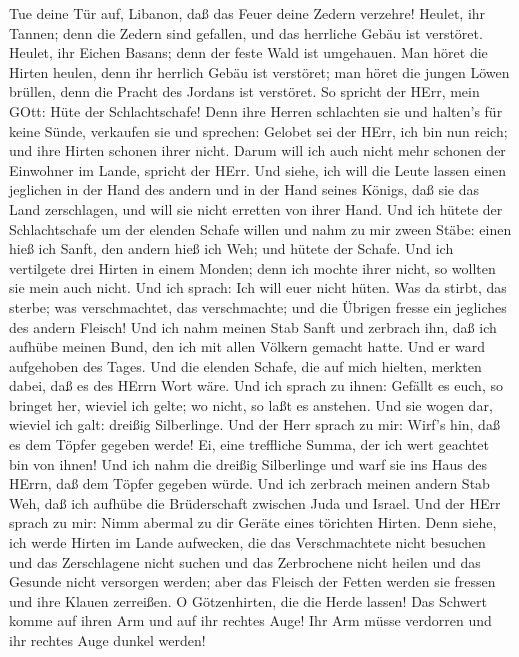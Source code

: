  Tue deine Tür auf, Libanon, daß das Feuer deine Zedern
verzehre!  Heulet, ihr Tannen; denn die Zedern sind
gefallen, und das herrliche Gebäu ist verstöret. Heulet, ihr Eichen
Basans; denn der feste Wald ist umgehauen.  Man höret die
Hirten heulen, denn ihr herrlich Gebäu ist verstöret; man höret die
jungen Löwen brüllen, denn die Pracht des Jordans ist verstöret.
 So spricht der HErr, mein GOtt: Hüte der Schlachtschafe!
 Denn ihre Herren schlachten sie und halten's für keine
Sünde, verkaufen sie und sprechen: Gelobet sei der HErr, ich bin nun
reich; und ihre Hirten schonen ihrer nicht.  Darum will ich
auch nicht mehr schonen der Einwohner im Lande, spricht der HErr. Und
siehe, ich will die Leute lassen einen jeglichen in der Hand des andern
und in der Hand seines Königs, daß sie das Land zerschlagen, und will
sie nicht erretten von ihrer Hand.  Und ich hütete der
Schlachtschafe um der elenden Schafe willen und nahm zu mir zween Stäbe:
einen hieß ich Sanft, den andern hieß ich Weh; und hütete der Schafe.
 Und ich vertilgete drei Hirten in einem Monden; denn ich
mochte ihrer nicht, so wollten sie mein auch nicht.  Und ich
sprach: Ich will euer nicht hüten. Was da stirbt, das sterbe; was
verschmachtet, das verschmachte; und die Übrigen fresse ein jegliches
des andern Fleisch!  Und ich nahm meinen Stab Sanft und
zerbrach ihn, daß ich aufhübe meinen Bund, den ich mit allen Völkern
gemacht hatte.  Und er ward aufgehoben des Tages. Und die
elenden Schafe, die auf mich hielten, merkten dabei, daß es des HErrn
Wort wäre.  Und ich sprach zu ihnen: Gefällt es euch, so
bringet her, wieviel ich gelte; wo nicht, so laßt es anstehen. Und sie
wogen dar, wieviel ich galt: dreißig Silberlinge.  Und der
Herr sprach zu mir: Wirf's hin, daß es dem Töpfer gegeben werde! Ei,
eine treffliche Summa, der ich wert geachtet bin von ihnen! Und ich nahm
die dreißig Silberlinge und warf sie ins Haus des HErrn, daß dem Töpfer
gegeben würde.  Und ich zerbrach meinen andern Stab Weh,
daß ich aufhübe die Brüderschaft zwischen Juda und Israel. 
Und der HErr sprach zu mir: Nimm abermal zu dir Geräte eines törichten
Hirten.  Denn siehe, ich werde Hirten im Lande aufwecken,
die das Verschmachtete nicht besuchen und das Zerschlagene nicht suchen
und das Zerbrochene nicht heilen und das Gesunde nicht versorgen werden;
aber das Fleisch der Fetten werden sie fressen und ihre Klauen
zerreißen.  O Götzenhirten, die die Herde lassen! Das
Schwert komme auf ihren Arm und auf ihr rechtes Auge! Ihr Arm müsse
verdorren und ihr rechtes Auge dunkel werden!

